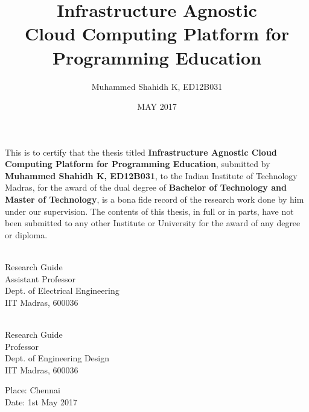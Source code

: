 \documentclass[DD]{iitmdiss}
\begin{document}

\title{Infrastructure Agnostic\\
	 Cloud Computing Platform for Programming Education}

\author{Muhammed Shahidh K, ED12B031}

\date{MAY 2017}

\maketitle

\certificate

\vspace*{0.5in}

\noindent This is to certify that the thesis titled {\bf Infrastructure Agnostic Cloud Computing Platform for Programming Education}, submitted by {\bf Muhammed Shahidh K, ED12B031}, 
  to the Indian Institute of Technology Madras, for
the award of the dual degree of {\bf Bachelor of Technology and Master of Technology}, is a bona fide
record of the research work done by him under our supervision.  The
contents of this thesis, in full or in parts, have not been submitted
to any other Institute or University for the award of any degree or
diploma.

\vspace*{1.5in}

\begin{singlespacing}
\hspace*{-0.25in}
\parbox{2.5in}{
 \\
\noindent Research Guide \\ 
\noindent Assistant Professor \\
\noindent Dept. of Electrical Engineering\\
\noindent IIT Madras, 600036 \\
} 
\hspace*{1.0in} 
\parbox{2.5in}{
 \\
\noindent Research Guide \\ 
\noindent Professor \\
\noindent Dept. of Engineering Design\\
\noindent IIT Madras, 600036 \\
}  
\end{singlespacing}
\vspace*{0.25in}
\noindent Place: Chennai\\
Date: 1st May 2017 
\end{document}
